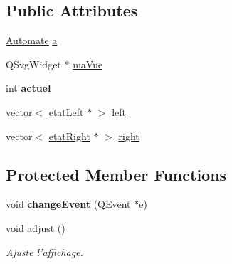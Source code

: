 \subsection*{Public Attributes}
\begin{DoxyCompactItemize}
\item 
\hyperlink{class_automate}{Automate} \hyperlink{class_create_automate_a00809917dbe83828485789bf25725964}{a}
\item 
Q\-Svg\-Widget $\ast$ \hyperlink{class_create_automate_a67da1a6995daa455a00771c099358a89}{ma\-Vue}
\item 
\hypertarget{class_create_automate_a599db4453047381fcd0d48dfb185da82}{int {\bfseries actuel}}\label{class_create_automate_a599db4453047381fcd0d48dfb185da82}

\item 
vector$<$ \hyperlink{classetat_left}{etat\-Left} $\ast$ $>$ \hyperlink{class_create_automate_a368e5fd06e6bafb6a297cb7d32d90655}{left}
\item 
vector$<$ \hyperlink{classetat_right}{etat\-Right} $\ast$ $>$ \hyperlink{class_create_automate_a8471078665ab7f4daf858c81f35496ac}{right}
\end{DoxyCompactItemize}
\subsection*{Protected Member Functions}
\begin{DoxyCompactItemize}
\item 
\hypertarget{class_create_automate_acae0d3eabf60d2ae32f75ad11aa59be6}{void {\bfseries change\-Event} (Q\-Event $\ast$e)}\label{class_create_automate_acae0d3eabf60d2ae32f75ad11aa59be6}

\item 
\hypertarget{class_create_automate_aad4103629c0487ca511f43502c290be0}{void \hyperlink{class_create_automate_aad4103629c0487ca511f43502c290be0}{adjust} ()}\label{class_create_automate_aad4103629c0487ca511f43502c290be0}

\begin{DoxyCompactList}\small\item\em Ajuste l'affichage. \end{DoxyCompactList}\end{DoxyCompactItemize}


